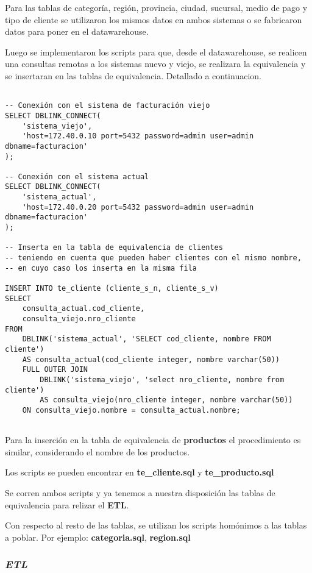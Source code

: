 Para las tablas de categoría, región, provincia, ciudad, sucursal, medio de pago y tipo de cliente se utilizaron los mismos datos en ambos sistemas o se fabricaron datos para poner en el datawarehouse.

Luego se implementaron los scripts para que, desde el datawarehouse, se realicen una consultas remotas a los sistemas nuevo y viejo, se realizara la equivalencia y se insertaran en las tablas de equivalencia. Detallado a continuacion. 

\begin{lstlisting}[title=Inserción a la tabla de equivalencia de cliente]

-- Conexión con el sistema de facturación viejo
SELECT DBLINK_CONNECT(
	'sistema_viejo',
	'host=172.40.0.10 port=5432 password=admin user=admin dbname=facturacion'
);

-- Conexión con el sistema actual
SELECT DBLINK_CONNECT(
	'sistema_actual',
	'host=172.40.0.20 port=5432 password=admin user=admin dbname=facturacion'
);

-- Inserta en la tabla de equivalencia de clientes
-- teniendo en cuenta que pueden haber clientes con el mismo nombre,
-- en cuyo caso los inserta en la misma fila

INSERT INTO te_cliente (cliente_s_n, cliente_s_v)
SELECT
    consulta_actual.cod_cliente,
    consulta_viejo.nro_cliente
FROM
    DBLINK('sistema_actual', 'SELECT cod_cliente, nombre FROM cliente')
    AS consulta_actual(cod_cliente integer, nombre varchar(50))
    FULL OUTER JOIN
        DBLINK('sistema_viejo', 'select nro_cliente, nombre from cliente')
        AS consulta_viejo(nro_cliente integer, nombre varchar(50))
    ON consulta_viejo.nombre = consulta_actual.nombre;
    
\end{lstlisting}

Para la inserción en la tabla de equivalencia de \textbf{productos} el procedimiento es similar, considerando el nombre de los productos.

Los scripts se pueden encontrar en \textbf{te\_cliente.sql} y \textbf{te\_producto.sql}

Se corren ambos scripts y ya tenemos a nuestra disposición las tablas de equivalencia para relizar el \textbf{ETL}.

Con respecto al resto de las tablas, se utilizan los scripts homónimos a las tablas a poblar. Por ejemplo: \textbf{categoria.sql}, \textbf{region.sql}


\subsubsection{\emph{ETL}}

